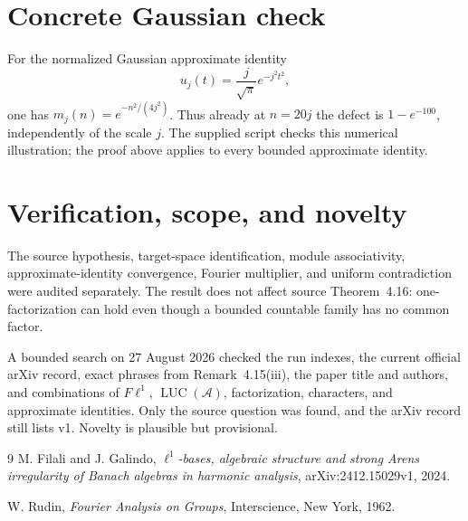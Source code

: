 \documentclass[10pt]{article}
\newcommand{\A}{\mathcal A}
\newcommand{\LUC}{\operatorname{LUC}}
\begin{document}
\section*{Concrete Gaussian check}

For the normalized Gaussian approximate identity
\[
 u_j(t)=\frac{j}{\sqrt\pi}e^{-j^2t^2},
\]
one has $m_j(n)=e^{-n^2/(4j^2)}$.  Thus already at $n=20j$ the defect is
$1-e^{-100}$, independently of the scale $j$.  The supplied script checks
this numerical illustration; the proof above applies to every bounded
approximate identity.

\section*{Verification, scope, and novelty}

The source hypothesis, target-space identification, module associativity,
approximate-identity convergence, Fourier multiplier, and uniform contradiction
were audited separately.  The result does not affect source Theorem~4.16:
one-factorization can hold even though a bounded countable family has no common
factor.

A bounded search on 27 August 2026 checked the run indexes, the current official
arXiv record, exact phrases from Remark~4.15(iii), the paper title and authors,
and combinations of $F\ell^1$, $\LUC(\A)$, factorization, characters, and
approximate identities.  Only the source question was found, and the arXiv
record still lists v1.  Novelty is plausible but provisional.

\begin{thebibliography}{9}
M. Filali and J. Galindo,
\emph{$\ell^1$-bases, algebraic structure and strong Arens irregularity of
Banach algebras in harmonic analysis}, arXiv:2412.15029v1, 2024.

W. Rudin,
\emph{Fourier Analysis on Groups}, Interscience, New York, 1962.
\end{thebibliography}
\end{document}
